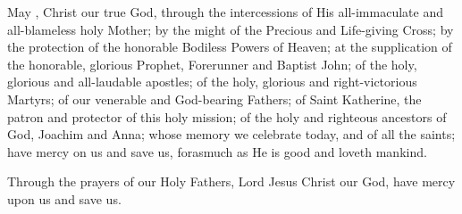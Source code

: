 \documentclass[twoside, letterpaper, 12pt]{report}
\begin{document}
\begin{priest}
\item May , Christ our true God, through the intercessions of His
    all-immaculate and all-blameless holy Mother; by the might of the Precious and Life-giving Cross;
    by the protection of the honorable Bodiless Powers of Heaven;
    at the supplication of the honorable, glorious Prophet, Forerunner and Baptist John;
    of the holy, glorious and all-laudable apostles;
    of the holy, glorious and right-victorious Martyrs;
    of our venerable and God-bearing Fathers;
    of Saint Katherine, the patron and protector of this holy mission;
    of the holy and righteous ancestors of God, Joachim and Anna;
     whose memory we celebrate today,
    and of all the saints;
    have mercy on us and save us, forasmuch as He is good and loveth mankind.
\item Through the prayers of our Holy Fathers, Lord Jesus Christ our God,
    have mercy upon us and save us.
\end{priest}
\end{document}
